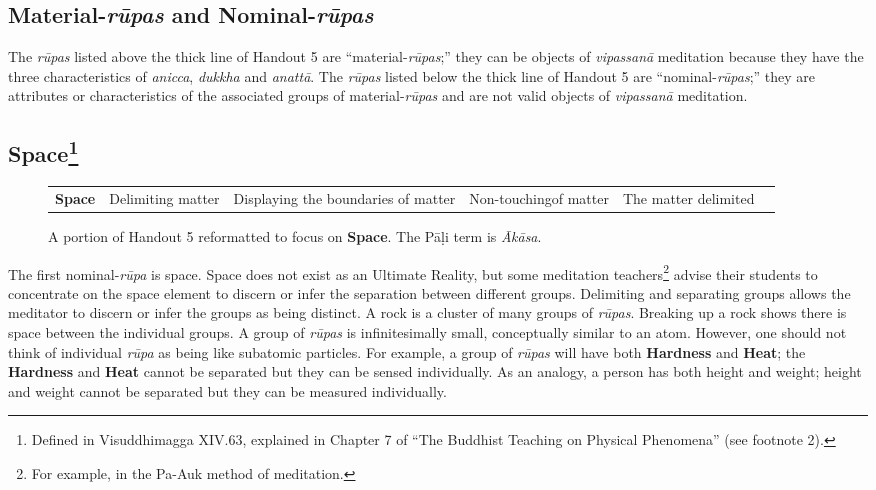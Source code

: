 \subsection*{Material-\textit{rūpas} and Nominal-\textit{rūpas}}

The \textit{rūpas} listed above the thick line of Handout 5 are “material-\textit{rūpas};” they can be objects of \textit{vipassanā} meditation because they have the three characteristics of \textit{anicca}, \textit{dukkha} and \textit{anattā}. The \textit{rūpas} listed below the thick line of Handout 5 are “nominal-\textit{rūpas};” they are attributes or characteristics of the associated groups of material-\textit{rūpas} and are not valid objects of \textit{vipassanā} meditation.

\subsection*{Space\footnote{Defined in Visuddhimagga XIV.63, explained in Chapter 7 of “The Buddhist Teaching on Physical Phenomena” (see footnote 2).}}

\begin{figure} [H]
\setlength{\tabcolsep}{0pt}
\renewcommand{\arraystretch}{1.1}
\noindent\begin{tabular}{P{0.25\textwidth} | C{.185\textwidth} C{0.185\textwidth} C{0.185\textwidth} C{0.195\textwidth} m{0mm}}
\toprule
 &  &  &  & \\
\midrule
\textbf{Space} & Delimiting matter & Displaying the boundaries of matter & Non-touching\newline of matter & The matter delimited &\\[9mm]

\bottomrule
\end{tabular}
\caption{A portion of Handout 5 reformatted to focus on \textbf{Space}. The Pāḷi term is \textit{Ākāsa}.}
\end{figure}

The first nominal-\textit{rūpa} is space. Space does not exist as an Ultimate Reality, but some meditation teachers\footnote{For example, in the Pa-Auk method of meditation.} advise their students to concentrate on the space element to discern or infer the separation between different groups. Delimiting and separating groups allows the meditator to discern or infer the groups as being distinct. A rock is a cluster of many groups of \textit{rūpas}. Breaking up a rock shows there is space between the individual groups. A group of \textit{rūpas} is infinitesimally small, conceptually similar to an atom. However, one should not think of individual \textit{rūpa} as being like subatomic particles. For example, a group of \textit{rūpas} will have both \textbf{Hardness} and \textbf{Heat}; the \textbf{Hardness} and \textbf{Heat} cannot be separated but they can be sensed individually. As an analogy, a person has both height and weight; height and weight cannot be separated but they can be measured individually.

